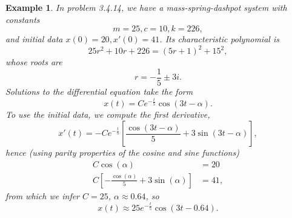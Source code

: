 \documentclass[11pt]{amsart}
\newtheorem{example}{Example}
\numberwithin{equation}{section}
\begin{document}
\begin{example}
In problem 3.4.14, we have a mass-spring-dashpot system with constants
\begin{equation*}
m=25, c=10, k=226,
\end{equation*}
and initial data $x(0)=20, x'(0)=41$. Its characteristic polynomial is 
\begin{equation*}
25r^2+10r+226 = (5r+1)^2+15^2, 
\end{equation*}
whose roots are 
\begin{equation*}
r=-\frac{1}{5}\pm 3i.
\end{equation*}
Solutions to the differential equation take the form
\begin{equation*}
x(t)=Ce^{-\frac{t}{5}}\cos(3t-\alpha).
\end{equation*}
To use the initial data, we compute the first derivative,
\begin{equation*}
x'(t)=-Ce^{-\frac{t}{5}}\left[\frac{\cos(3t-\alpha)}{5}+3\sin(3t-\alpha)\right],
\end{equation*}
hence (using parity properties of the cosine and sine functions)
\begin{align*}
C\cos(\alpha) & = 20 \\
C\left[ - \frac{\cos(\alpha)}{5} + 3\sin(\alpha) \right] & = 41,
\end{align*}
from which we infer $C=25$, $\alpha \approx 0.64$, so 
\begin{equation*}
x(t) \approx 25e^{-\frac{t}{5}}\cos(3t-0.64).
\end{equation*}
\end{example}
\end{document}

